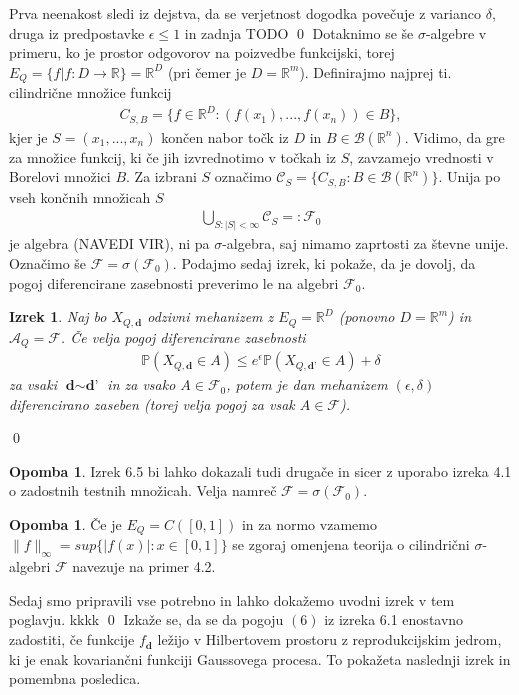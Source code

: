 \documentclass[12pt,a4paper]{amsart}
\theoremstyle{definition} %
\newtheorem{opomba}[definicija]{Opomba}
\theoremstyle{plain} %
\newtheorem{izrek}[definicija]{Izrek}
\begin{document}
Prva neenakost sledi iz dejstva, da se verjetnost dogodka povečuje z varianco $\delta$, druga iz predpostavke $\epsilon \leq 1$ in zadnja TODO
\qed
\newline
\newline
Dotaknimo se še $\sigma$-algebre v primeru, ko je prostor odgovorov na poizvedbe funkcijski, torej $E_Q = \{f | f : D \rightarrow \mathbb{R}\} = \mathbb{R}^D$ (pri čemer je $D=\mathbb{R}^m$). Definirajmo najprej ti. cilindrične množice funkcij 
\begin{gather*}
C_{S,B} = \{ f \in \mathbb{R}^D : (f(x_1), ..., f(x_n)) \in B \},
\end{gather*}
kjer je $S = (x_1,...,x_n)$ končen nabor točk iz $D$ in $B \in \mathcal{B}(\mathbb{R}^n)$. Vidimo, da gre za množice funkcij, ki če jih izvrednotimo v točkah iz $S$, zavzamejo vrednosti v Borelovi množici $B$. Za izbrani $S$ označimo $\mathcal{C}_S = \{ C_{S,B} : B \in \mathcal{B}(\mathbb{R}^n) \}$. Unija po vseh končnih množicah $S$
\begin{gather*}
\bigcup_{S : |S| < \infty} \mathcal{C}_S =: \mathcal{F}_0
\end{gather*}
je algebra (NAVEDI VIR), ni pa $\sigma$-algebra, saj nimamo zaprtosti za števne unije. Označimo še $\mathcal{F} = \sigma(\mathcal{F}_0)$. Podajmo sedaj izrek, ki pokaže, da je dovolj, da pogoj diferencirane zasebnosti preverimo le na algebri $\mathcal{F}_0$. 
\begin{izrek}
Naj bo $X_{Q,\textbf{d}}$ odzivni mehanizem z $E_Q = \mathbb{R}^D$ (ponovno $D = \mathbb{R}^m$) in $\mathcal{A}_Q = \mathcal{F}$. Če velja pogoj diferencirane zasebnosti 
\begin{gather*}
\mathbb{P}(X_{Q,\textbf{d}} \in A) \leq e^\epsilon \mathbb{P}(X_{Q,\textbf{d'}} \in A) + \delta
\end{gather*}
za vsaki $\textbf{d} \sim \textbf{d'}$ in za vsako $A \in \mathcal{F}_0$, potem je dan mehanizem $(\epsilon, \delta)$ diferencirano zaseben (torej velja pogoj za vsak $A \in \mathcal{F}$).
\end{izrek}
\proof 
\qed
\newline
\begin{opomba}
Izrek 6.5 bi lahko dokazali tudi drugače in sicer z uporabo izreka 4.1 o zadostnih testnih množicah. Velja namreč $\mathcal{F} = \sigma(\mathcal{F}_0).$
\end{opomba}
\begin{opomba}
Če je $E_Q = C ([0,1])$ in za normo vzamemo $\|f\|_{\infty} = sup\{|f(x)| : x \in [0,1]\}$ se zgoraj omenjena teorija o cilindrični $\sigma$-algebri $\mathcal{F}$ navezuje na primer 4.2.
\end{opomba}
Sedaj smo pripravili vse potrebno in lahko dokažemo uvodni izrek v tem poglavju.
kkkk
\qed
\newline
\newline
Izkaže se, da se da pogoju $(6)$ iz izreka 6.1 enostavno zadostiti, če funkcije $f_{\textbf{d}}$ ležijo v Hilbertovem prostoru z reprodukcijskim jedrom, ki je enak kovariančni funkciji Gaussovega procesa. To pokažeta naslednji izrek in pomembna posledica.
\end{document}
